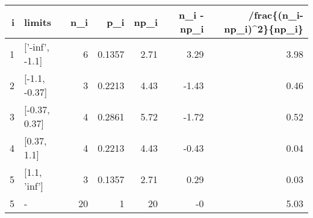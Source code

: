 \begin{tabular}{rlrrrrr}
\hline
   i & limits         &   n\_i &    p\_i &   np\_i &   n\_i - np\_i &   /frac\{(n\_i-np\_i)\^{}2\}\{np\_i\} \\
\hline
   1 & ['-inf', -1.1] &     6 & 0.1357 &   2.71 &         3.29 &                        3.98 \\
   2 & [-1.1, -0.37]  &     3 & 0.2213 &   4.43 &        -1.43 &                        0.46 \\
   3 & [-0.37, 0.37]  &     4 & 0.2861 &   5.72 &        -1.72 &                        0.52 \\
   4 & [0.37, 1.1]    &     4 & 0.2213 &   4.43 &        -0.43 &                        0.04 \\
   5 & [1.1, 'inf']   &     3 & 0.1357 &   2.71 &         0.29 &                        0.03 \\
   5 & -              &    20 & 1      &  20    &        -0    &                        5.03 \\
\hline
\end{tabular}